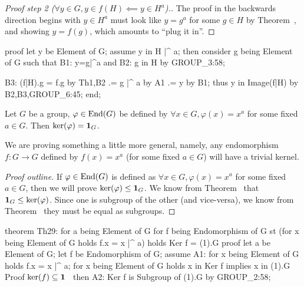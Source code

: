 \begin{proof}[{Proof step 2 ($\forall y\in G, y \in f(H)\impliedby y\in H^{a}$)}.]
The proof in the backwards direction begins with $y\in H^{a}$ must look
like $y = g^{a}$ for some $g\in H$ by Theorem~,
and showing $y = f(g)$, which amounts to ``plug it in''.
\end{proof}

\nwenddocs{}\endmoddef\nwstartdeflinemarkup{}\nwenddeflinemarkup
proof
  let y be Element of G;
  assume y in H |^ a;
  then consider g being Element of G such that
  B1:    y=g|^a and
  B2:    g in H
  by GROUP_3:58;

  B3: (f|H).g = f.g by Th1,B2
             .= g |^ a by A1
             .= y by B1;
  thus y in Image(f|H) by B2,B3,GROUP_6:45;
end;
\nwendcode{}\nwdocspar

\begin{theorem}\label{thm:characteristic:inner:ker-of-inner-is-trivial}
Let $G$ be a group, $\varphi\in\operatorname{End}(G)$ be defined by $\forall x\in
G,\varphi(x)=x^{a}$ for some fixed $a\in G$.
Then $\ker(\varphi)=\mathbf{1}_{G}$.
\end{theorem}

We are proving something a little
more general, namely, any endomorphism $f\colon G\to G$ defined by
$f(x)=x^{a}$ (for some fixed $a\in G$) will have a trivial kernel.

\begin{proof}[Proof outline]
If $\varphi\in\operatorname{End}(G)$ is defined as $\forall x\in G,\varphi(x)=x^{a}$
for some fixed $a\in G$, then we will prove
$\ker(\varphi)\leq\mathbf{1}_{G}$. We know from Theorem~%
 that $\mathbf{1}_{G}\leq\ker(\varphi)$.
Since one is subgroup of the other (and vice-versa), we know from
Theorem~ they must be equal as subgroups.
\end{proof}

\nwenddocs{}\endmoddef\nwstartdeflinemarkup{}\nwenddeflinemarkup
theorem Th29:
  for a being Element of G
  for f being Endomorphism of G
  st (for x being Element of G holds f.x = x |^ a)
  holds Ker f = (1).G
proof
  let a be Element of G;
  let f be Endomorphism of G;
  assume A1: for x being Element of G holds f.x = x |^ a;
  for x being Element of G holds x in Ker f implies x in (1).G
  \LA{}Proof $\ker(f)\subseteq\mathbf{1}$~{\nwtagstyle{}}\RA{}
  then A2: Ker f is Subgroup of (1).G by GROUP_2:58;

